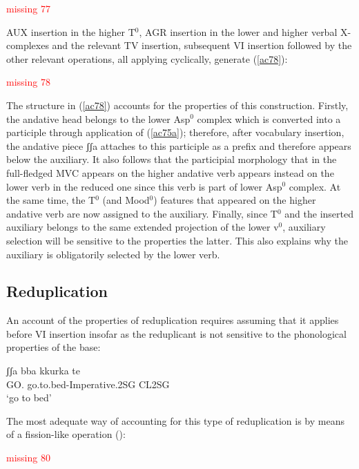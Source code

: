 \documentclass[output=paper]{langscibook}
\begin{document}
\ea\label{ac77}
\textcolor{red}{missing 77}
\z

AUX insertion in the higher T$^0$, AGR insertion in the lower and higher verbal X-complexes and the relevant TV insertion, subsequent VI insertion followed by the other relevant operations, all applying cyclically, generate (\ref{ac78}): 

\ea\label{ac78}
\textcolor{red}{missing 78}
\z

The structure in (\ref{ac78}) accounts for the properties of this construction. Firstly, the andative head belongs to the lower Asp$^0$ complex which is converted into a participle through application of (\ref{ac75a}); therefore, after vocabulary insertion, the andative piece ʃʃa attaches to this participle as a prefix and therefore appears below the auxiliary. It also follows that the participial morphology that in the full-fledged MVC appears on the higher andative verb appears instead on the lower verb in the reduced one since this verb is part of lower Asp$^0$ complex.  At the same time, the T$^0$ (and Mood$^0$) features that appeared on the higher andative verb are now assigned to the auxiliary. Finally, since T$^0$ and the inserted auxiliary belongs to the same extended projection of the lower v$^0$, auxiliary selection will be sensitive to the properties the latter. This also explains why the auxiliary is obligatorily selected by the lower verb.

\subsection{Reduplication}

An account of the properties of reduplication requires assuming that it applies before VI insertion insofar as the reduplicant is not sensitive to the phonological properties of the base:

\ea \label{ac79}\gll ʃʃa  bba  kkurka te\\
    GO. go.to.bed-Imperative.2SG CL2SG\\
   \glt ‘go to bed’
\z

The most adequate way of accounting for this type of reduplication is by means of a fission-like operation (\cite{calabrese1988a, noyer1992a, arregi2012a, calabrese2014a}): 


\ea\label{ac80}
\textcolor{red}{missing 80}
\z
\end{document}
